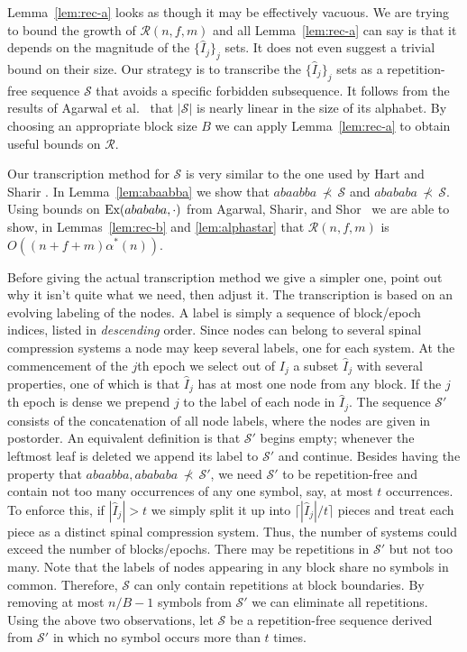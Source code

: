 \documentclass{article}
\newcommand{\ceil}[1]{\lceil #1 \rceil}
\newcommand{\Ex}{\mbox{\rm Ex}}
\newcommand{\Seq}{\mathscr{S}}
\newcommand{\Rec}{\mathscr{R}}
\newcommand{\nsubseq}{\,\nprec\,}
\begin{document}
Lemma~\ref{lem:rec-a} looks as though it may be effectively vacuous.
We are trying to bound the growth of $\Rec(n,f,m)$ and all Lemma~\ref{lem:rec-a} can say 
is that it depends on the magnitude of the $\{\hat{I}_j\}_j$ sets.  It does not even suggest a trivial
bound on their size.   Our strategy is to transcribe the $\{\hat{I}_j\}_j$ sets as a repetition-free
sequence $\Seq$ that avoids a specific forbidden subsequence.  It follows from the results of Agarwal et al.~\cite{ASS89}
that $|\Seq|$ is nearly linear in the size of its alphabet.
By choosing an appropriate block size $B$ we can apply Lemma~\ref{lem:rec-a} to obtain useful bounds on $\Rec$.

Our transcription method for $\Seq$
is very similar to the one used by Hart and Sharir \cite{HS86}.  
In Lemma~\ref{lem:abaabba} we show that $abaabba\nsubseq \Seq$ and $abababa\nsubseq \Seq$.
Using bounds on $\Ex(abababa,\cdot)$ from Agarwal, Sharir, and Shor~\cite{ASS89} we 
are able to show, in Lemmas~\ref{lem:rec-b} and \ref{lem:alphastar} that $\Rec(n,f,m)$ is $O((n+f+m)\alpha^*(n))$.

Before giving the actual transcription method we give a simpler one, point out why it 
isn't quite what we need, then adjust it.  The transcription is based on an evolving labeling
of the nodes.  A label is simply a sequence of block/epoch indices, listed in {\em descending} order.
Since nodes can belong to several spinal compression systems a node may keep several labels,
one for each system.
At the commencement of the $j$th epoch we
select out of $I_j$ a subset $\hat{I}_j$ with several properties, one of which is that
$\hat{I}_j$ has at most one node from any block.  If the $j$th epoch is dense
we prepend $j$ to the label of each node in $\hat{I}_j$.  The sequence $\Seq'$ consists
of the concatenation of all node labels, where the nodes are given in postorder.  An equivalent definition
is that $\Seq'$ begins empty; whenever the leftmost leaf is deleted we append its label to $\Seq'$ and continue.
Besides having the property that $abaabba, abababa\nsubseq \Seq'$, we need
$\Seq'$ to be repetition-free and contain not too many occurrences of any one symbol,
say, at most $t$ occurrences.  To enforce this, if $|\hat{I}_j| > t$ we simply split it up into $\ceil{|\hat{I}_j|/t}$ pieces
and treat each piece as a distinct spinal compression system.  Thus, the number of systems could 
exceed the number of blocks/epochs.  There may be repetitions in $\Seq'$ but not too many.  Note that the labels
of nodes appearing in any block share no symbols in common.  Therefore, $\Seq$ can only contain repetitions at block boundaries.
By removing at most $n/B - 1$ symbols from $\Seq'$ we can eliminate all repetitions.  
Using the above two observations, let $\Seq$ be a repetition-free sequence derived from $\Seq'$ in 
which no symbol occurs more than $t$ times.
\end{document}
